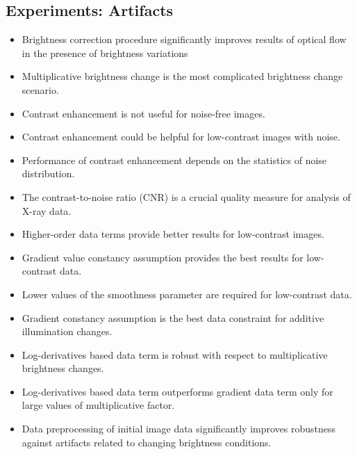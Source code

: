 \subsection*{Experiments: Artifacts}
\begin{itemize}	
	
	\item Brightness correction procedure significantly improves results of optical flow in the presence of brightness variations
	
	\item Multiplicative brightness change is the most complicated brightness change scenario.
	
	\item Contrast enhancement is not useful for noise-free images.
	
	\item Contrast enhancement could be helpful for low-contrast images with noise.
	
	\item Performance of contrast enhancement depends on the statistics of noise distribution.
	
	\item The contrast-to-noise ratio (CNR) is a crucial quality measure for analysis of X-ray data.
	
	\item Higher-order data terms provide better results for low-contrast images.
	
	\item Gradient value constancy assumption provides the best results for low-contrast data.
	
	\item Lower values of the smoothness parameter are required for low-contrast data.
	
	\item Gradient constancy assumption is the best data constraint for additive illumination changes.
	
	\item Log-derivatives based data term is robust with respect to multiplicative brightness changes.
	
	\item Log-derivatives based data term outperforms gradient data term only for large values of multiplicative factor.
	
	\item Data preprocessing of initial image data significantly improves robustness against artifacts related to changing brightness conditions.
	

\end{itemize}
